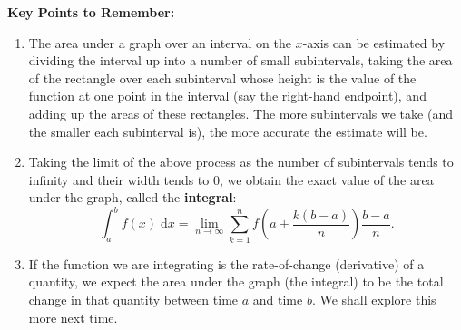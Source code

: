 \documentclass{article}
\newcommand{\diff}{\;\mathrm{d}}
\begin{document}
\clearpage


{\bf Key Points to Remember:}

\vspace{5mm}

\begin{enumerate}
	\item The area under a graph over an interval on the $x$-axis can be estimated by dividing the interval up into a number of small subintervals, taking the area of the rectangle over each subinterval whose height is the value of the function at one point in the interval (say the right-hand endpoint), and adding up the areas of these rectangles. The more subintervals we take (and the smaller each subinterval is), the more accurate the estimate will be.
	\item Taking the limit of the above process as the number of subintervals tends to infinity and their width tends to 0, we obtain the exact value of the area under the graph, called the \textbf{integral}:
		\[\int_a^b f(x)\diff x=\lim_{n\to \infty}\sum_{k=1}^nf\left(a+\frac{k(b-a)}{n}\right)\frac{b-a}{n}.\]
	\item If the function we are integrating is the rate-of-change (derivative) of a quantity, we expect the area under the graph (the integral) to be the total change in that quantity between time $a$ and time $b$. We shall explore this more next time.
\end{enumerate}
\end{document}

